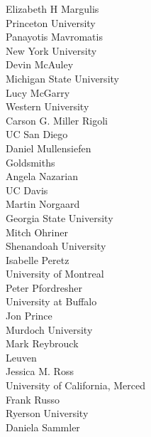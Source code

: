 \begin{multicols}{2}
Elizabeth H Margulis\\
\vspace{.5em}Princeton University\\
Panayotis Mavromatis\\
\vspace{.5em}New York University\\
Devin McAuley\\
\vspace{.5em}Michigan State University\\
Lucy McGarry\\
\vspace{.5em}Western University\\
Carson G. Miller Rigoli\\
\vspace{.5em}UC San Diego\\
Daniel Mullensiefen\\
\vspace{.5em}Goldsmiths\\
Angela Nazarian\\
\vspace{.5em}UC Davis\\
Martin Norgaard\\
\vspace{.5em}Georgia State University\\
Mitch Ohriner\\
\vspace{.5em}Shenandoah University\\
Isabelle Peretz\\
\vspace{.5em}University of Montreal\\
Peter Pfordresher\\
\vspace{.5em}University at Buffalo\\
Jon Prince\\
\vspace{.5em}Murdoch University\\
Mark Reybrouck\\
\vspace{.5em}Leuven\\
Jessica M. Ross\\
\vspace{.5em}University of California, Merced\\
Frank Russo\\
\vspace{.5em}Ryerson University\\
Daniela Sammler\\

\end{multicols}
